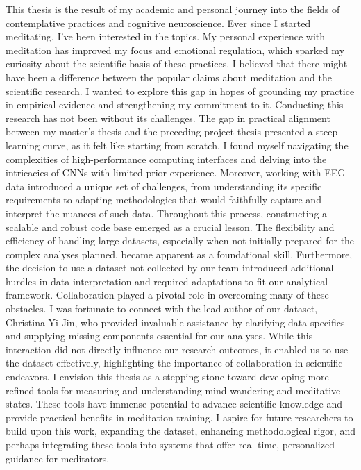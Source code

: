 This thesis is the result of my academic and personal journey into the fields of contemplative practices and cognitive neuroscience. Ever since I started meditating, I've been interested in the topics. My personal experience with meditation has improved my focus and emotional regulation, which sparked my curiosity about the scientific basis of these practices. I believed that there might have been a difference between the popular claims about meditation and the scientific research. I wanted to explore this gap in hopes of grounding my practice in empirical evidence and strengthening my commitment to it.
\newline
Conducting this research has not been without its challenges. The gap in practical alignment between my master's thesis and the preceding project thesis presented a steep learning curve, as it felt like starting from scratch. I found myself navigating the complexities of high-performance computing interfaces and delving into the intricacies of CNNs with limited prior experience. Moreover, working with EEG data introduced a unique set of challenges, from understanding its specific requirements to adapting methodologies that would faithfully capture and interpret the nuances of such data.
\newline
Throughout this process, constructing a scalable and robust code base emerged as a crucial lesson. The flexibility and efficiency of handling large datasets, especially when not initially prepared for the complex analyses planned, became apparent as a foundational skill. Furthermore, the decision to use a dataset not collected by our team introduced additional hurdles in data interpretation and required adaptations to fit our analytical framework.
\newline
Collaboration played a pivotal role in overcoming many of these obstacles. I was fortunate to connect with the lead author of our dataset, Christina Yi Jin, who provided invaluable assistance by clarifying data specifics and supplying missing components essential for our analyses. While this interaction did not directly influence our research outcomes, it enabled us to use the dataset effectively, highlighting the importance of collaboration in scientific endeavors.
\newline
I envision this thesis as a stepping stone toward developing more refined tools for measuring and understanding mind-wandering and meditative states. These tools have immense potential to advance scientific knowledge and provide practical benefits in meditation training. I aspire for future researchers to build upon this work, expanding the dataset, enhancing methodological rigor, and perhaps integrating these tools into systems that offer real-time, personalized guidance for meditators.
